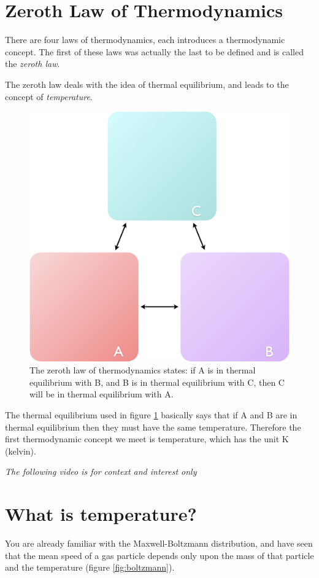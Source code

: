\documentclass[
]{book}
\begin{document}
\hypertarget{sec:zeroth}{%
\section{Zeroth Law of Thermodynamics}\label{sec:zeroth}}

There are four laws of thermodynamics, each introduces a thermodynamic concept. The first of these laws was actually the last to be defined and is called the \emph{zeroth law}.

The zeroth law deals with the idea of thermal equilibrium, and leads to the concept of \emph{temperature}.

\begin{figure}

{\centering \includegraphics[width=0.5\linewidth]{images/thermalequilibrium} 

}

\caption{The zeroth law of thermodynamics states: if A is in thermal equilibrium with B, and B is in thermal equilibrium with C, then C will be in thermal equilibrium with A.}\label{fig:zerothlaw}
\end{figure}

The thermal equilibrium used in figure \ref{fig:zerothlaw} basically says that if A and B are in thermal equilibrium then they must have the same temperature. Therefore the first thermodynamic concept we meet is temperature, which has the unit K (kelvin).

\emph{The following video is for context and interest only}

\hypertarget{what-is-temperature}{%
\section{What is temperature?}\label{what-is-temperature}}

You are already familiar with the Maxwell-Boltzmann distribution, and have seen that the mean speed of a gas particle depends only upon the mass of that particle and the temperature (figure \ref{fig:boltzmann}).
\end{document}
